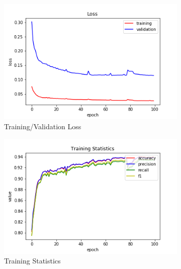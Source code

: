 \begin{figure}[h!]
  \centerfloat
  \begin{subfigure}[b]{0.35\linewidth}
    \includegraphics[width=\linewidth]{images/trained_online_lstm/tile_by_tile_training_uniform_random_fill_10000_block_map_10000_house_10000_model_loss.png}
     \caption{Training/Validation Loss}
  \end{subfigure}
  \hfill
  \begin{subfigure}[b]{0.35\linewidth}
    \includegraphics[width=\linewidth]{images/trained_online_lstm/tile_by_tile_training_uniform_random_fill_10000_block_map_10000_house_10000_model_training_stats.png}
     \caption{Training Statistics}
  \end{subfigure}
  \hfill
  \begin{subfigure}[b]{0.35\linewidth}

\end{subfigure}
\end{figure}

